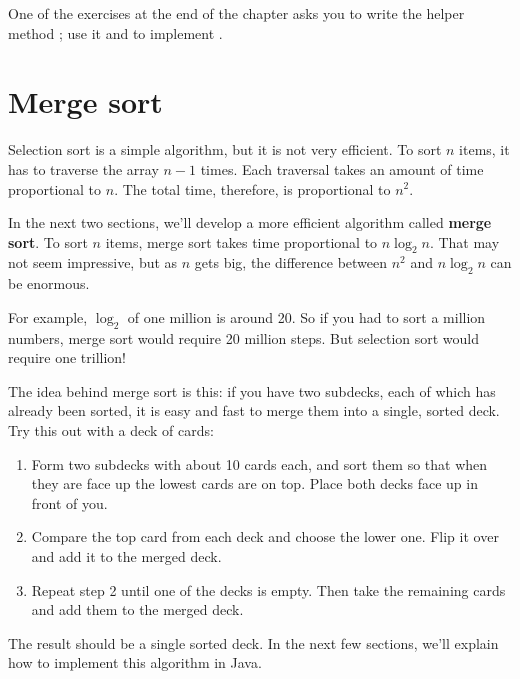 One of the exercises at the end of the chapter asks you to write the helper method ; use it and  to implement .


\section{Merge sort}
\label{mergesort}


Selection sort is a simple algorithm, but it is not very efficient.
To sort $n$ items, it has to traverse the array $n-1$ times.
Each traversal takes an amount of time proportional to $n$.
The total time, therefore, is proportional to $n^2$.


In the next two sections, we'll develop a more efficient algorithm called {\bf merge sort}.
To sort $n$ items, merge sort takes time proportional to $n \log_2 n$.
That may not seem impressive, but as $n$ gets big, the difference between $n^2$ and $n \log_2 n$ can be enormous.

For example, $\log_2$ of one million is around 20.
So if you had to sort a million numbers, merge sort would require 20 million steps.
But selection sort would require one trillion!

The idea behind merge sort is this: if you have two subdecks, each of which has already been sorted, it is easy and fast to merge them into a single, sorted deck.
Try this out with a deck of cards:

\begin{enumerate}

\item Form two subdecks with about 10 cards each, and sort them so that when they are face up the lowest cards are on top.
Place both decks face up in front of you.

\item Compare the top card from each deck and choose the lower one.
Flip it over and add it to the merged deck.

\item Repeat step 2 until one of the decks is empty.
Then take the remaining cards and add them to the merged deck.

\end{enumerate}

The result should be a single sorted deck.
In the next few sections, we'll explain how to implement this algorithm in Java.


